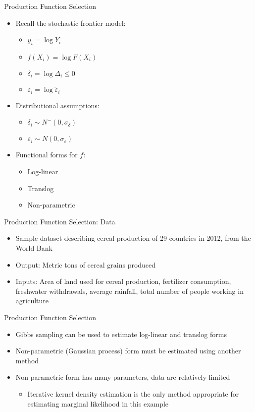 \documentclass{beamer}
\newcommand{\ep}{\varepsilon}
\begin{document}
\begin{frame}{Production Function Selection}
\begin{itemize}
	\item Recall the stochastic frontier model:
		\begin{itemize}
			\item $y_i = \log Y_i$
			\item $f(X_i) = \log F(X_i)$
			\item $\delta_i = \log \Delta_i \leq 0$
			\item $\ep_i = \log \tilde\ep_i$
		\end{itemize}
	\item Distributional assumptions:
		\begin{itemize}
			\item $\delta_i\sim N^-(0, \sigma_\delta)$
			\item $\ep_i\sim N(0, \sigma_\ep)$
		\end{itemize}
	\item Functional forms for $f$:
		\begin{itemize}
			\item Log-linear
			\item Translog
			\item Non-parametric
		\end{itemize}
\end{itemize}
\end{frame}

\begin{frame}{Production Function Selection: Data}
\begin{itemize}
	\item Sample dataset describing cereal production of 29 countries in 2012, from the World Bank
	\item Output: Metric tons of cereal grains produced
	\item Inputs: Area of land used for cereal production, fertilizer consumption, freshwater withdrawals, average rainfall, total number of people working in agriculture
\end{itemize}
\end{frame}

\begin{frame}{Production Function Selection}
\begin{itemize}
	\item Gibbs sampling can be used to estimate log-linear and translog forms
	\item Non-parametric (Gaussian process) form must be estimated using another method
	\item Non-parametric form has many parameters, data are relatively limited
		\begin{itemize}
			\item Iterative kernel density estimation is the only method appropriate for estimating marginal likelihood in this example
		\end{itemize}
\end{itemize}
\end{frame}
\end{document}
